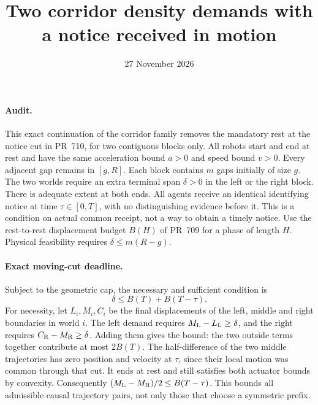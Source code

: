 \documentclass[11pt]{article}
\title{Two corridor density demands with a notice received in motion}
\date{27 November 2026}
\begin{document}
\maketitle
\paragraph{Audit.}
This exact continuation of the corridor family removes the
mandatory rest at the notice cut in PR~710, for two contiguous
blocks only. All robots start and end at rest and have the
same acceleration bound \(a>0\) and speed bound \(v>0\).
Every adjacent gap remains in \([g,R]\). Each block contains
\(m\) gaps initially of size \(g\). The two worlds require an
extra terminal span \(\delta>0\) in the left or the right block.
There is adequate extent at both ends. All agents receive an
identical identifying notice at time \(\tau\in[0,T]\), with
no distinguishing evidence before it. This is a condition on
actual common receipt, not a way to obtain a timely notice.
Use the rest-to-rest displacement budget \(B(H)\) of PR~709
for a phase of length \(H\). Physical feasibility requires
\(\delta\le m(R-g)\).

\paragraph{Exact moving-cut deadline.}
Subject to the geometric cap, the necessary and sufficient
condition is
\[
                       \delta\le B(T)+B(T-\tau).
\]
For necessity, let \(L_i,M_i,C_i\) be the final displacements
of the left, middle and right boundaries in world \(i\).
The left demand requires \(M_{\rm L}-L_{\rm L}\ge\delta\),
and the right requires \(C_{\rm R}-M_{\rm R}\ge\delta\).
Adding them gives the bound: the two outside terms together
contribute at most \(2B(T)\). The half-difference of the
two middle trajectories has zero position and velocity at
\(\tau\), since their local motion was common through that
cut. It ends at rest and still satisfies both actuator bounds
by convexity. Consequently \((M_{\rm L}-M_{\rm R})/2\le
B(T-\tau)\). This bounds all admissible causal trajectory
pairs, not only those that choose a symmetric prefix.
\end{document}
